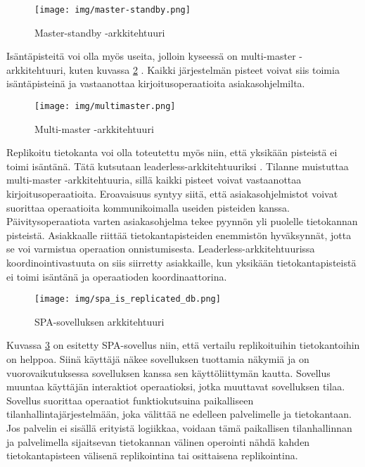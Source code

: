 \documentclass[finnish,twoside,censored,csm,sw-track-2018]{HYthesisML}
\begin{document}
\begin{figure}[ht]
  \centering
    \texttt{[image: img/master-standby.png]}
  \caption{Master-standby -arkkitehtuuri}
  \label{fig-masterstandby}
\end{figure}

Isäntäpisteitä voi olla myös useita, jolloin kyseessä on multi-master -arkkitehtuuri, kuten kuvassa \ref{fig-multimaster} \citep{Kleppmann}. Kaikki järjestelmän pisteet voivat siis toimia isäntäpisteinä ja vastaanottaa kirjoitusoperaatioita asiakasohjelmilta.

\begin{figure}[ht]
  \centering
    \texttt{[image: img/multimaster.png]}
  \caption{Multi-master -arkkitehtuuri}
  \label{fig-multimaster}
\end{figure}

Replikoitu tietokanta voi olla toteutettu myös niin, että yksikään pisteistä ei toimi isäntänä. Tätä kutsutaan leaderless-arkkitehtuuriksi \cite{Kleppmann}. Tilanne muistuttaa multi-master -arkkitehtuuria, sillä kaikki pisteet voivat vastaanottaa kirjoitusoperaatioita. Eroavaisuus syntyy siitä, että asiakasohjelmistot voivat suorittaa operaatioita kommunikoimalla useiden pisteiden kanssa. Päivitysoperaatiota varten asiakasohjelma tekee pyynnön yli puolelle tietokannan pisteistä. Asiakkaalle riittää tietokantapisteiden enemmistön hyväksynnät, jotta se voi varmistua operaation onnistumisesta. Leaderless-arkkitehtuurissa koordinointivastuuta on siis siirretty asiakkaille, kun yksikään tietokantapisteistä ei toimi isäntänä ja operaatioden koordinaattorina.

\begin{figure}[ht]
  \centering
    \texttt{[image: img/spa\_is\_replicated\_db.png]}
  \caption{SPA-sovelluksen arkkitehtuuri}
  \label{fig-spa-is-replicated}
\end{figure}

Kuvassa \ref{fig-spa-is-replicated} on esitetty SPA-sovellus niin, että vertailu replikoituihin tietokantoihin on helppoa. Siinä käyttäjä näkee sovelluksen tuottamia näkymiä ja on vuorovaikutuksessa sovelluksen kanssa sen käyttöliittymän kautta. Sovellus muuntaa käyttäjän interaktiot operaatioksi, jotka muuttavat sovelluksen tilaa. Sovellus suorittaa operaatiot funktiokutsuina paikalliseen tilanhallintajärjestelmään, joka välittää ne edelleen palvelimelle ja tietokantaan. Jos palvelin ei sisällä erityistä logiikkaa, voidaan tämä paikallisen tilanhallinnan ja palvelimella sijaitsevan tietokannan välinen operointi nähdä kahden tietokantapisteen välisenä replikointina tai osittaisena replikointina.
\end{document}
